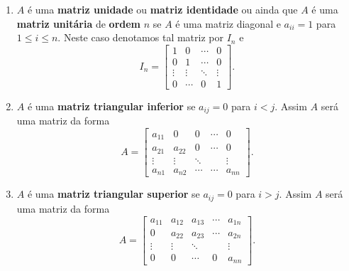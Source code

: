 \begin{definicao}
\begin{enumerate}[label={\roman*})]
        \item $A$ é uma \textbf{matriz unidade} ou \textbf{matriz identidade} ou ainda que $A$ é uma \textbf{matriz unitária} de
            \textbf{ordem} $n$ se $A$ é uma matriz diagonal e $a_{ii} = 1$ para $1 \le i \le n$. Neste caso denotamos tal matriz por $I_n$ e
        \[
            I_n = \begin{bmatrix}
                1 & 0 & \cdots & 0\\
                0 & 1 & \cdots & 0\\
                \vdots & \vdots & \ddots & \vdots\\
                0 & \cdots & 0 & 1
            \end{bmatrix}.
        \]
    \item $A$ é uma \textbf{matriz triangular inferior} se $a_{ij} = 0$ para $i < j$. Assim $A$ será uma matriz da forma
    \[
        A = \begin{bmatrix}
                a_{11} & 0 & 0 & \cdots & 0\\
                a_{21} & a_{22} & 0 & \cdots & 0\\
                \vdots & \vdots & \ddots & & \vdots\\
                a_{n1} & a_{n2} & \cdots & \cdots &  a_{nn}
        \end{bmatrix}.
    \]
    \item $A$ é uma \textbf{matriz triangular superior} se $a_{ij} = 0$ para $i > j$. Assim $A$ será uma matriz da forma
    \[
        A = \begin{bmatrix}
                a_{11} & a_{12} & a_{13} & \cdots & a_{1n}\\
                0 & a_{22} & a_{23} & \cdots & a_{2n}\\
                \vdots & \vdots & \ddots & & \vdots\\
                0 & 0 & \cdots & 0 &  a_{nn}
        \end{bmatrix}.
    \]
    \end{enumerate}
\end{definicao}

